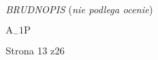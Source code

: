\documentclass[a4paper,12pt]{article}
\begin{document}
{\it BRUDNOPIS} ({\it nie podlega ocenie})

$\mathrm{A}_{-}1\mathrm{P}$

Strona 13 z26
\end{document}
